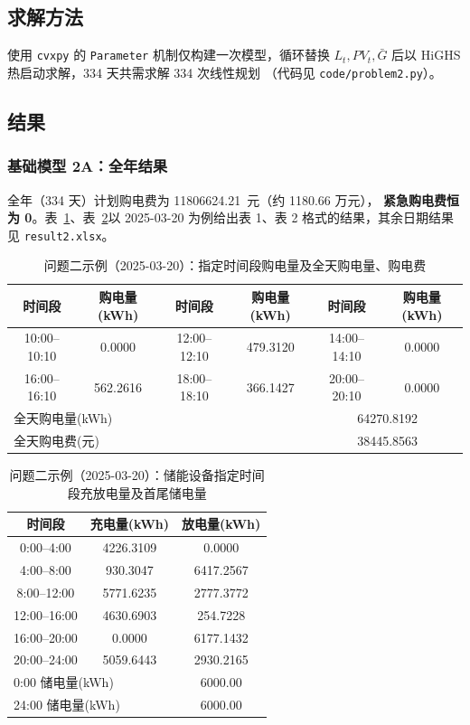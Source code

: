 \documentclass[withoutpreface,bwprint]{cumcmthesis}
\begin{document}
\subsection{求解方法}
使用 \texttt{cvxpy} 的 \texttt{Parameter} 机制仅构建一次模型，循环替换
$L_t,PV_t,\bar G$ 后以 HiGHS 热启动求解，334 天共需求解 334 次线性规划
（代码见 \texttt{code/problem2.py}）。

\subsection{结果}
\subsubsection{基础模型 2A：全年结果}
全年（334 天）计划购电费为 \num{11806624.21}~元（约 1180.66 万元），
\textbf{紧急购电费恒为 0}。表~\ref{tab:q2-t1}、表~\ref{tab:q2-t2}以
2025-03-20 为例给出表 1、表 2 格式的结果，其余日期结果见
\texttt{result2.xlsx}。

\begin{table}[!htbp]
\caption{问题二示例（2025-03-20）：指定时间段购电量及全天购电量、购电费}\label{tab:q2-t1}\centering
\begin{tabular}{cccccc}
\toprule[1.5pt]
时间段 & 购电量(kWh) & 时间段 & 购电量(kWh) & 时间段 & 购电量(kWh)\\
\midrule[1pt]
10:00--10:10 & 0.0000 & 12:00--12:10 & 479.3120 & 14:00--14:10 & 0.0000\\
16:00--16:10 & 562.2616 & 18:00--18:10 & 366.1427 & 20:00--20:10 & 0.0000\\
\midrule[1pt]
\multicolumn{4}{l}{全天购电量(kWh)} & \multicolumn{2}{c}{64270.8192}\\
\multicolumn{4}{l}{全天购电费(元)} & \multicolumn{2}{c}{38445.8563}\\
\bottomrule[1.5pt]
\end{tabular}
\end{table}

\begin{table}[!htbp]
\caption{问题二示例（2025-03-20）：储能设备指定时间段充放电量及首尾储电量}\label{tab:q2-t2}\centering
\begin{tabular}{ccc}
\toprule[1.5pt]
时间段 & 充电量(kWh) & 放电量(kWh)\\
\midrule[1pt]
0:00--4:00   & 4226.3109 & 0.0000\\
4:00--8:00   & 930.3047  & 6417.2567\\
8:00--12:00  & 5771.6235 & 2777.3772\\
12:00--16:00 & 4630.6903 & 254.7228\\
16:00--20:00 & 0.0000    & 6177.1432\\
20:00--24:00 & 5059.6443 & 2930.2165\\
\midrule[1pt]
\multicolumn{2}{l}{0:00 储电量(kWh)} & 6000.00\\
\multicolumn{2}{l}{24:00 储电量(kWh)} & 6000.00\\
\bottomrule[1.5pt]
\end{tabular}
\end{table}
\end{document}
